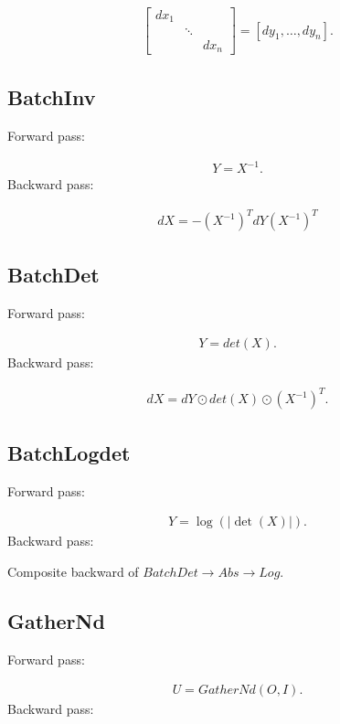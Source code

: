 \documentclass{article}
\begin{document}
\begin{eqnarray}
  \begin{bmatrix}
    dx_1 & & \\
    & \ddots & \\
    & & dx_n 
  \end{bmatrix}
  = [dy_1, \ldots, dy_n].
\end{eqnarray}


\subsection{BatchInv}

Forward pass:

\begin{eqnarray}
  Y = X^{-1}.
\end{eqnarray}
%
Backward pass:

\begin{eqnarray}
  dX = -(X^{-1})^T dY (X^{-1})^T
\end{eqnarray}


\subsection{BatchDet}

Forward pass:

\begin{eqnarray}
  Y = det(X).
\end{eqnarray}
%
Backward pass:

\begin{eqnarray}
  dX = dY \odot det(X) \odot (X^{-1})^T.
\end{eqnarray}

\subsection{BatchLogdet}

Forward pass:

\begin{eqnarray}
  Y = \log(|\det(X)|).
\end{eqnarray}
%
Backward pass:

Composite backward of $BatchDet \rightarrow Abs \rightarrow Log$.

\subsection{GatherNd}

Forward pass:

\begin{eqnarray}
  U = GatherNd(O, I).
\end{eqnarray}
%
Backward pass:
\end{document}
